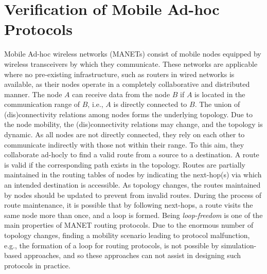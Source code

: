 \section{Verification of Mobile Ad-hoc Protocols}\label{sec::wrebeca} 
Mobile Ad-hoc wireless networks (MANETs) consist of mobile nodes equipped by wireless transceivers by which they communicate. These networks are applicable where no pre-existing infrastructure, such as routers in wired networks %
is available, as their nodes operate in a completely collaborative and distributed manner. The node $A$ can receive data from the node $B$ if $A$ is located in the communication range of $B$, i.e., $A$ is directly connected to $B$. The union of (dis)connectivity relations among nodes forms the underlying topology.  Due to the node mobility, the (dis)connectivity relations may change, and the topology is dynamic. As all nodes are not directly connected, they rely on each other to communicate indirectly with those not within their range. To this aim, they collaborate ad-hocly to find a valid route from a source to a destination. A route is valid if the corresponding path exists in the topology. Routes are partially maintained in the routing tables of nodes by indicating the next-hop(s) via which an intended destination is accessible. As topology changes, the routes maintained by nodes should be updated to prevent from invalid routes. %
During the process of route maintenance, it is possible that by following next-hops, a route visits the same node more than once, and a loop is formed. Being \emph{loop-freedom} is one of the main properties of MANET routing protocols. Due to the enormous number of topology changes, finding a mobility scenario leading to protocol malfunction, e.g., the formation of a loop for routing protocols, is not possible by simulation-based approaches, and so these approaches can not assist in designing such protocols in practice.   


